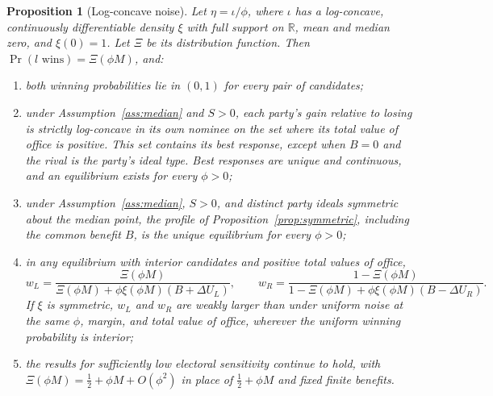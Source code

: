 \documentclass[12pt,letterpaper]{article}
\newtheorem{proposition}{Proposition}
\begin{document}
\begin{proposition}[Log-concave noise]\label{prop:logconcave}
Let $\eta=\iota/\phi$, where $\iota$ has a log-concave, continuously differentiable density $\xi$ with full support on $\mathbb R$, mean and median zero, and $\xi(0)=1$. Let $\Xi$ be its distribution function. Then $\Pr(l\text{ wins})=\Xi(\phi M)$, and:
\begin{enumerate}
  \item[(a)] both winning probabilities lie in $(0,1)$ for every pair of candidates;
  \item[(b)] under Assumption~\ref{ass:median} and $S>0$, each party's gain relative to losing is strictly log-concave in its own nominee on the set where its total value of office is positive. This set contains its best response, except when $B=0$ and the rival is the party's ideal type. Best responses are unique and continuous, and an equilibrium exists for every $\phi>0$;
  \item[(c)] under Assumption~\ref{ass:median}, $S>0$, and distinct party ideals symmetric about the median point, the profile of Proposition~\ref{prop:symmetric}, including the common benefit $B$, is the unique equilibrium for every $\phi>0$;
  \item[(d)] in any equilibrium with interior candidates and positive total values of office,
  \[
  w_L=\frac{\Xi(\phi M)}{\Xi(\phi M)+\phi\xi(\phi M)(B+\Delta U_L)},
  \qquad
  w_R=\frac{1-\Xi(\phi M)}{1-\Xi(\phi M)+\phi\xi(\phi M)(B-\Delta U_R)}.
  \]
  If $\xi$ is symmetric, $w_L$ and $w_R$ are weakly larger than under uniform noise at the same $\phi$, margin, and total value of office, wherever the uniform winning probability is interior;
  \item[(e)] the results for sufficiently low electoral sensitivity continue to hold, with $\Xi(\phi M)=\tfrac12+\phi M+O(\phi^2)$ in place of $\tfrac12+\phi M$ and fixed finite benefits.
\end{enumerate}
\end{proposition}
\end{document}
